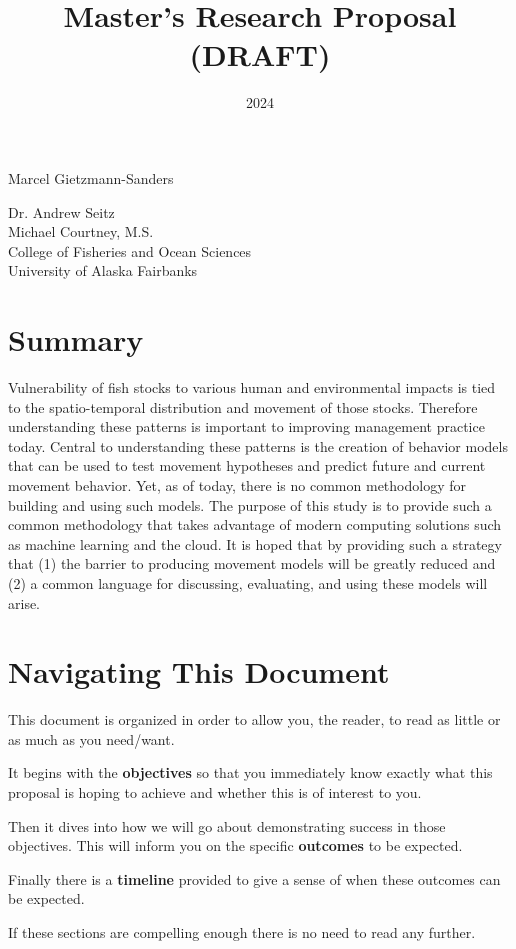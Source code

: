 \documentclass[11pt]{article}
\title{Master's Research Proposal (DRAFT)}
\date{2024}
\makeatletter
\renewcommand{\maketitle}{
\begin{center}

\pagestyle{empty}
\phantom{.}  %
\vspace{3cm}

{\Huge \bf \@title\par}
\vspace{2.5cm}

{\LARGE Marcel Gietzmann-Sanders}\\[1cm]

{\Large\@date}

\vspace{2.5cm}
{\Large Dr. Andrew Seitz}\hspace{2cm}{\Large Dr. Curry Cunningham}\\[2cm]{\Large Michael Courtney, M.S.}\\[2cm]
College of Fisheries and Ocean Sciences\\
University of Alaska Fairbanks


\end{center}
}\makeatother
\makeatother
\begin{document}
\maketitle
\newpage

\section{Summary}

Vulnerability of fish stocks to various human and environmental impacts is tied to the spatio-temporal distribution and movement of those stocks. Therefore understanding these patterns is important to improving management practice today. Central to understanding these patterns is the creation of behavior models that can be used to test movement hypotheses and predict future and current movement behavior. Yet, as of today, there is no common methodology for building and using such models. The purpose of this study is to provide such a common methodology that takes advantage of modern computing solutions such as machine learning and the cloud. It is hoped that by providing such a strategy that (1) the barrier to producing movement models will be greatly reduced and (2) a common language for discussing, evaluating, and using these models will arise. 

\newpage

\section{Navigating This Document}

This document is organized in order to allow you, the reader, to read as little or as much as you need/want. \newline

It begins with the \textbf{objectives} so that you immediately know exactly what this proposal is hoping to achieve and whether this is of interest to you.  \newline

Then it dives into how we will go about demonstrating success in those objectives. This will inform you on the specific \textbf{outcomes} to be expected. \newline

Finally there is a \textbf{timeline} provided to give a sense of when these outcomes can be expected. \newline

If these sections are compelling enough there is no need to read any further. \newline
\end{document}
